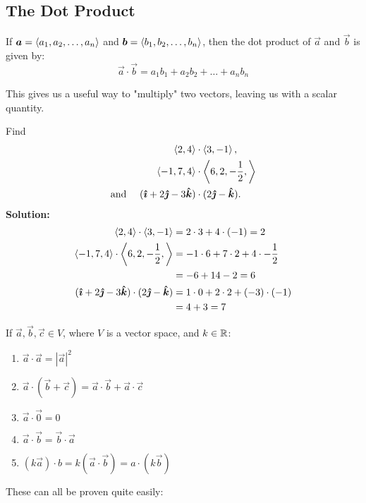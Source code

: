 \subsection{The Dot Product}
\begin{definition}
    If \(\boldsymbol{a}=\left\langle a_1, a_2, \dots, a_n\right\rangle\) and \(\boldsymbol{b}=\left\langle b_1, b_2, \dots, b_n\right\rangle\), then the dot product of \(\vec a\) and \(\vec b\) is given by:
    \[\vec a \cdot \vec b = a_1b_1+a_2b_2+\dots+a_nb_n\]
\end{definition}
This gives us a useful way to "multiply" two vectors, leaving us with a scalar quantity. 
\begin{example}
    Find \begin{align*}
        \left\langle2,4\right\rangle&\cdot \left\langle3,-1\right\rangle, \\ \left\langle-1, 7, 4\right\rangle&\cdot\left\langle6,2,-\frac{1}{2},\right\rangle\\ \text{and }\quad (\boldsymbol{\hat{\imath}} + 2\boldsymbol{\hat{\jmath}} - 3\boldsymbol{\hat{k}}) &\cdot (2\boldsymbol{\hat{\jmath}} - \boldsymbol{\hat{k}}).
    \end{align*}
     \textbf{Solution:}
     \begin{align*}
         \left\langle2,4\right\rangle\cdot \left\langle3,-1\right\rangle&=2\cdot 3+4\cdot (-1) = 2 \\
          \left\langle-1, 7, 4\right\rangle\cdot\left\langle6,2,-\frac{1}{2},\right\rangle &= -1 \cdot 6 + 7\cdot 2 + 4 \cdot -\frac{1}{2} \\
          &= -6+14-2 = 6 \\
          (\boldsymbol{\hat{\imath}} + 2\boldsymbol{\hat{\jmath}} - 3\boldsymbol{\hat{k}}) \cdot (2\boldsymbol{\hat{\jmath}} - \boldsymbol{\hat{k}}) &= 1\cdot 0 + 2\cdot 2 +(-3)\cdot (-1) \\
          &=4+3 = 7
     \end{align*}
\end{example}
\begin{theorem}
    If \(\vec a, \vec b, \vec c \in V\), where \(V\) is a vector space, and \(k\in \mathbb{R}\):
    \begin{enumerate}
        \item \(\vec a \cdot \vec a = |\vec a|^2\) 
        \item \(\vec a \cdot (\vec b + \vec c) = \vec a\cdot \vec b + \vec a \cdot \vec c\)
        \item \(\vec a \cdot \vec 0 = 0\)
        \item \(\vec a \cdot \vec b = \vec b \cdot \vec a\)
        \item \((k\vec a)\cdot b=k(\vec a\cdot \vec b)=a\cdot (k\vec b)\)
    \end{enumerate}
\end{theorem}
These can all be proven quite easily:

